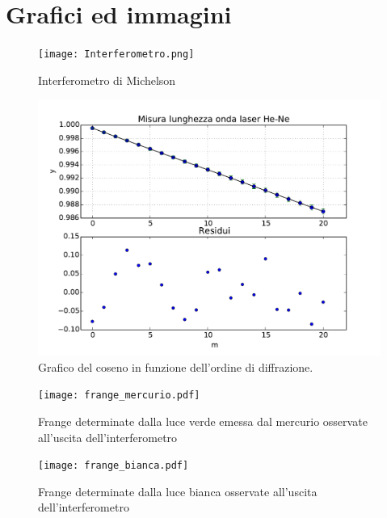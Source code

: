 \section{Grafici ed immagini}
\begin{figure}[h]
	\centering
	\texttt{[image: Interferometro.png]}
	\caption{Interferometro di Michelson}
	\label{f:figura_1}
\end{figure}
\begin{figure}[h]
	\centering
	\includegraphics[scale=0.5]{grafico.pdf}
	\caption{Grafico del coseno in funzione dell'ordine di diffrazione.}
           \label{f:figura_2}
\end{figure}

\begin{figure}[h]
	\centering
	\texttt{[image: frange\_mercurio.pdf]}
	\caption{Frange determinate dalla luce verde emessa dal mercurio osservate all'uscita dell'interferometro}
           \label{f:frange_mercurio}
\end{figure}

\begin{figure}[h]
	\centering
	\texttt{[image: frange\_bianca.pdf]}
	\caption{Frange determinate dalla luce bianca osservate all'uscita dell'interferometro}
           \label{f:frange_bianca}
\end{figure}